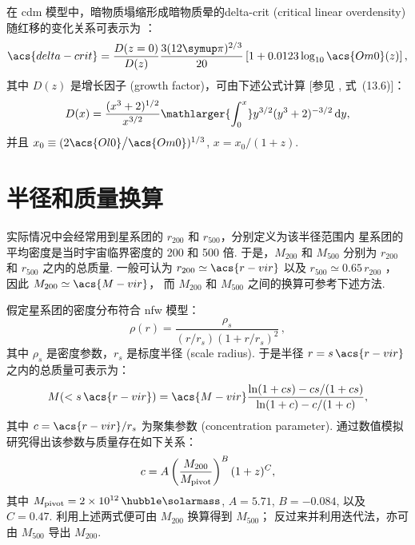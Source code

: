 在 \ac{cdm} 模型中，暗物质塌缩形成暗物质晕的\acl{delta-crit}
(critical linear overdensity)
随红移的变化关系可表示为 \cite{kitayama1996,randall2002}：
\begin{equation}
  \label{eq:delta-crit}
  \acs{delta-crit} = \frac{D(z=0)}{D(z)}
    \frac{3 (12\Cpi)^{2/3}}{20}
    \left[1 + 0.0123 \log_{10} \acs{Om0}(z) \right] ,
\end{equation}
其中 $D(z)$ 是增长因子 (growth factor)，可由下述公式计算
[参见 , 式~(13.6)]：
\begin{equation}
  \label{eq:growth-factor}
  D(x) = \frac{(x^3 + 2)^{1/2}}{x^{3/2}}
    \mathlarger{\int_0^x} y^{3/2} (y^3 + 2)^{-3/2} \,\D{y} ,
\end{equation}
并且 $x_0 \equiv (2 \acs{Ol0} \big/ \acs{Om0})^{1/3}$,
$x = x_0 \big/ (1+z)$.


\section{半径和质量换算}

实际情况中会经常用到星系团的 $r_{200}$ 和 $r_{500}$，分别定义为该半径范围内
星系团的平均密度是当时宇宙临界密度的 200 和 500 倍.
于是，$M_{200}$ 和 $M_{500}$ 分别为 $r_{200}$ 和 $r_{500}$ 之内的总质量.
一般可认为 $r_{200} \simeq \acs{r-vir}$
以及 $r_{500} \simeq 0.65 \, r_{200}$ \cite{ettori2009}，
因此 $M_{200} \simeq \acs{M-vir}$，
而 $M_{200}$ 和 $M_{500}$ 之间的换算可参考下述方法.

假定星系团的密度分布符合 \ac{nfw} 模型\cite{navarro1997}：
\begin{equation}
  \label{eq:nfw}
  \rho(r) = \frac{\rho_s}{
    (r / r_s) (1 + r / r_s)^2} \,,
\end{equation}
其中 $\rho_s$ 是密度参数，$r_s$ 是标度半径 (scale radius).
于是半径 $r = s \,\acs{r-vir}$ 之内的总质量可表示为\cite{lokas2001}：
\begin{equation}
  \label{eq:mass-r}
  M(< s \,\acs{r-vir}) = \acs{M-vir}
    \frac{\ln(1 + c s) - c s / (1 + c s)}{\ln(1 + c) - c / (1 + c)} ,
\end{equation}
其中 $c = \acs{r-vir} / r_s$ 为聚集参数 (concentration parameter).
 通过数值模拟研究得出该参数与质量存在如下关系：
\begin{equation}
  \label{eq:mass-c}
  c = A \left( \frac{M_{200}}{M_{\mathrm{pivot}}} \right)^B (1+z)^C ,
\end{equation}
其中 $M_{\R{pivot}} = \SI{2e12}{\per\hubble\solarmass}$,
$A = 5.71$, $B = -0.084$, 以及 $C = 0.47$.
利用上述两式便可由 $M_{200}$ 换算得到 $M_{500}$；
反过来并利用迭代法，亦可由 $M_{500}$ 导出 $M_{200}$.


